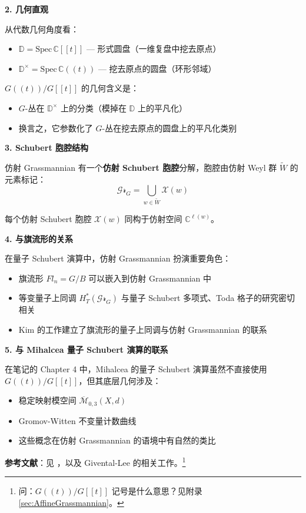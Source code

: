 \textbf{2. 几何直观}

从代数几何角度看：
\begin{itemize}
\item $\mathbb{D} = \mathrm{Spec}\,\mathbb{C}[[t]]$ — 形式圆盘（一维复盘中挖去原点）
\item $\mathbb{D}^\times = \mathrm{Spec}\,\mathbb{C}((t))$ — 挖去原点的圆盘（环形邻域）
\end{itemize}

$G((t))/G[[t]]$ 的几何含义是：
\begin{itemize}
\item $G$-丛在 $\mathbb{D}^\times$ 上的分类（模掉在 $\mathbb{D}$ 上的平凡化）
\item 换言之，它参数化了 $G$-丛在挖去原点的圆盘上的平凡化类别
\end{itemize}

\textbf{3. Schubert 胞腔结构}

仿射 Grassmannian 有一个\textbf{仿射 Schubert 胞腔}分解，胞腔由仿射 Weyl 群 $\widetilde{W}$ 的元素标记：
$$\mathcal{Gr}_G = \bigcup_{w \in \widetilde{W}} \mathcal{X}(w)$$

每个仿射 Schubert 胞腔 $\mathcal{X}(w)$ 同构于仿射空间 $\mathbb{C}^{\ell(w)}$。

\textbf{4. 与旗流形的关系}

在量子 Schubert 演算中，仿射 Grassmannian 扮演重要角色：
\begin{itemize}
\item 旗流形 $Fl_n = G/B$ 可以嵌入到仿射 Grassmannian 中
\item 等变量子上同调 $H_T^*(\mathcal{Gr}_G)$ 与量子 Schubert 多项式、Toda 格子的研究密切相关
\item Kim 的工作建立了旗流形的量子上同调与仿射 Grassmannian 的联系
\end{itemize}

\textbf{5. 与 Mihalcea 量子 Schubert 演算的联系}

在笔记的 Chapter 4 中，Mihalcea 的量子 Schubert 演算虽然不直接使用 $G((t))/G[[t]]$，但其底层几何涉及：
\begin{itemize}
\item 稳定映射模空间 $\overline{\mathcal{M}}_{0,3}(X,d)$
\item Gromov-Witten 不变量计数曲线
\item 这些概念在仿射 Grassmannian 的语境中有自然的类比
\end{itemize}

\textbf{参考文献}：见 \cite[Chapter 4]{Mihalcea}，以及 Givental-Lee 的相关工作。\footnote{问：$G((t))/G[[t]]$ 记号是什么意思？见附录 \cref{sec:AffineGrassmannian}。}

